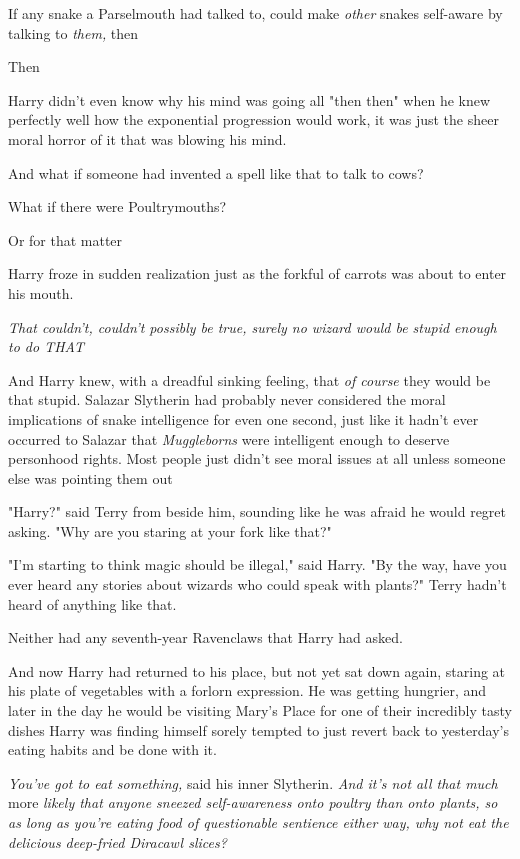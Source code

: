 If any snake a Parselmouth had talked to, could make \emph{other} snakes
self-aware by talking to \emph{them,} then{\el}

Then{\el}

Harry didn't even know why his mind was going all "then{\el} then{\el}"
when he knew perfectly well how the exponential progression would work, it was
just the sheer moral horror of it that was blowing his mind.

And what if someone had invented a spell like that to talk to cows?

What if there were Poultrymouths?

Or for that matter{\el}

Harry froze in sudden realization just as the forkful of carrots was about to
enter his mouth.

\emph{That couldn't, couldn't possibly be true, surely no wizard would be
stupid enough to do THAT{\el}}

And Harry knew, with a dreadful sinking feeling, that \emph{of course} they
would be that stupid. Salazar Slytherin had probably never considered the moral
implications of snake intelligence for even one second, just like it hadn't
ever occurred to Salazar that \emph{Muggleborns} were intelligent enough to
deserve personhood rights. Most people just didn't see moral issues at all
unless someone else was pointing them out{\el}

"Harry?" said Terry from beside him, sounding like he was afraid he would
regret asking. "Why are you staring at your fork like that?"

"I'm starting to think magic should be illegal," said Harry. "By the way, have
you ever heard any stories about wizards who could speak with plants?"
\sbreak
Terry hadn't heard of anything like that.

Neither had any seventh-year Ravenclaws that Harry had asked.

And now Harry had returned to his place, but not yet sat down again, staring at
his plate of vegetables with a forlorn expression. He was getting hungrier, and
later in the day he would be visiting Mary's Place for one of their incredibly
tasty dishes{\el} Harry was finding himself sorely tempted to just revert
back to yesterday's eating habits and be done with it.

\emph{You've got to eat something,} said his inner Slytherin. \emph{And it's
not all that much} more \emph{likely that anyone sneezed self-awareness onto
poultry than onto plants, so as long as you're eating food of questionable
sentience either way, why not eat the delicious deep-fried Diracawl slices?}

